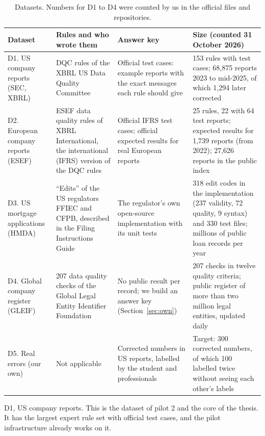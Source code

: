 \documentclass[11pt,a4paper]{article}
\begin{document}
\begin{table}[htbp]
\centering
\footnotesize
\begin{tabularx}{\textwidth}{@{}p{2.5cm}p{3.3cm}LL@{}}
\toprule
Dataset & Rules and who wrote them & Answer key & Size (counted 31 October 2026) \\
\midrule
D1. US company reports (SEC, XBRL) & DQC rules of the XBRL US Data Quality Committee \cite{dqc} & Official test cases: example reports with the exact messages each rule should give & 153 rules with test cases; 68{,}875 reports 2023 to mid-2025, of which 1{,}294 later corrected \cite{fsds} \\
D2. European company reports (ESEF) & ESEF data quality rules of XBRL International, the international (IFRS) version of the DQC rules \cite{esefdqr} & Official IFRS test cases; official expected results for real European reports \cite{dqrconf} & 25 rules, 22 with 64 test reports; expected results for 1{,}739 reports (from 2022); 27{,}626 reports in the public index \cite{esef} \\
D3. US mortgage applications (HMDA) & ``Edits'' of the US regulators FFIEC and CFPB, described in the Filing Instructions Guide \cite{hmda} & The regulator's own open-source implementation with its unit tests \cite{hmdaplatform} & 318 edit codes in the implementation (237 validity, 72 quality, 9 syntax) and 330 test files; millions of public loan records per year \\
D4. Global company register (GLEIF) & 207 data quality checks of the Global Legal Entity Identifier Foundation \cite{gleif} & No public result per record; we build an answer key (Section~\ref{sec:own}) & 207 checks in twelve quality criteria; public register of more than two million legal entities, updated daily \\
D5. Real errors (our own) & Not applicable & Corrected numbers in US reports, labelled by the student and professionals & Target: 300 corrected numbers, of which 100 labelled twice without seeing each other's labels \\
\bottomrule
\end{tabularx}
\caption{Datasets. Numbers for D1 to D4 were counted by us in the official files and repositories.}
\label{tab:data}
\end{table}

D1, US company reports. This is the dataset of pilot 2 and the core of the thesis. It has the largest expert rule set with official test cases, and the pilot infrastructure already works on it.
\end{document}
